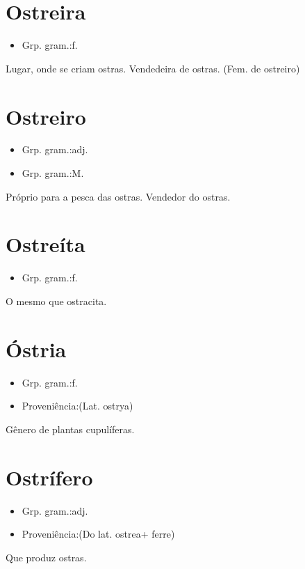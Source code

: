 \section{Ostreira}
\begin{itemize}
\item {Grp. gram.:f.}
\end{itemize}
Lugar, onde se criam ostras.
Vendedeira de ostras.
(Fem. de \textunderscore ostreiro\textunderscore )
\section{Ostreiro}
\begin{itemize}
\item {Grp. gram.:adj.}
\end{itemize}
\begin{itemize}
\item {Grp. gram.:M.}
\end{itemize}
Próprio para a pesca das ostras.
Vendedor do ostras.
\section{Ostreíta}
\begin{itemize}
\item {Grp. gram.:f.}
\end{itemize}
O mesmo que \textunderscore ostracita\textunderscore .
\section{Óstria}
\begin{itemize}
\item {Grp. gram.:f.}
\end{itemize}
\begin{itemize}
\item {Proveniência:(Lat. \textunderscore ostrya\textunderscore )}
\end{itemize}
Gênero de plantas cupulíferas.
\section{Ostrífero}
\begin{itemize}
\item {Grp. gram.:adj.}
\end{itemize}
\begin{itemize}
\item {Proveniência:(Do lat. \textunderscore ostrea\textunderscore  + \textunderscore ferre\textunderscore )}
\end{itemize}
Que produz ostras.
